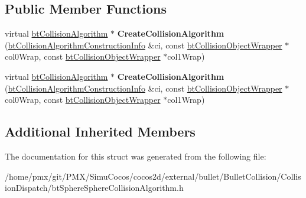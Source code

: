 \subsection*{Public Member Functions}
\begin{DoxyCompactItemize}
\item 
\mbox{\label{structbtSphereSphereCollisionAlgorithm_1_1CreateFunc_af0dddc096640e42de8388e2d20fbad59}} 
virtual \hyperlink{classbtCollisionAlgorithm}{bt\+Collision\+Algorithm} $\ast$ {\bfseries Create\+Collision\+Algorithm} (\hyperlink{structbtCollisionAlgorithmConstructionInfo}{bt\+Collision\+Algorithm\+Construction\+Info} \&ci, const \hyperlink{structbtCollisionObjectWrapper}{bt\+Collision\+Object\+Wrapper} $\ast$col0\+Wrap, const \hyperlink{structbtCollisionObjectWrapper}{bt\+Collision\+Object\+Wrapper} $\ast$col1\+Wrap)
\item 
\mbox{\label{structbtSphereSphereCollisionAlgorithm_1_1CreateFunc_af0dddc096640e42de8388e2d20fbad59}} 
virtual \hyperlink{classbtCollisionAlgorithm}{bt\+Collision\+Algorithm} $\ast$ {\bfseries Create\+Collision\+Algorithm} (\hyperlink{structbtCollisionAlgorithmConstructionInfo}{bt\+Collision\+Algorithm\+Construction\+Info} \&ci, const \hyperlink{structbtCollisionObjectWrapper}{bt\+Collision\+Object\+Wrapper} $\ast$col0\+Wrap, const \hyperlink{structbtCollisionObjectWrapper}{bt\+Collision\+Object\+Wrapper} $\ast$col1\+Wrap)
\end{DoxyCompactItemize}
\subsection*{Additional Inherited Members}


The documentation for this struct was generated from the following file\+:\begin{DoxyCompactItemize}
\item 
/home/pmx/git/\+P\+M\+X/\+Simu\+Cocos/cocos2d/external/bullet/\+Bullet\+Collision/\+Collision\+Dispatch/bt\+Sphere\+Sphere\+Collision\+Algorithm.\+h\end{DoxyCompactItemize}
